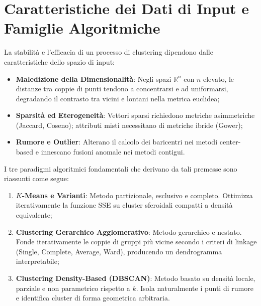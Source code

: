 \section{Caratteristiche dei Dati di Input e Famiglie Algoritmiche}
\label{sec:dm-data-characteristics-algorithms}

La stabilità e l'efficacia di un processo di clustering dipendono dalle caratteristiche dello spazio di input:
\begin{itemize}
    \item \textbf{Maledizione della Dimensionalità}: Negli spazi $\mathbb{R}^n$ con $n$ elevato, le distanze tra coppie di punti tendono a concentrarsi e ad uniformarsi, degradando il contrasto tra vicini e lontani nella metrica euclidea;
    \item \textbf{Sparsità ed Eterogeneità}: Vettori sparsi richiedono metriche asimmetriche (Jaccard, Coseno); attributi misti necessitano di metriche ibride (Gower);
    \item \textbf{Rumore e Outlier}: Alterano il calcolo dei baricentri nei metodi center-based e innescano fusioni anomale nei metodi contigui.
\end{itemize}

I tre paradigmi algoritmici fondamentali che derivano da tali premesse sono riassunti come segue:
\begin{enumerate}
    \item \textbf{$K$-Means e Varianti}: Metodo partizionale, esclusivo e completo. Ottimizza iterativamente la funzione SSE su cluster sferoidali compatti a densità equivalente;
    \item \textbf{Clustering Gerarchico Agglomerativo}: Metodo gerarchico e nestato. Fonde iterativamente le coppie di gruppi più vicine secondo i criteri di linkage (Single, Complete, Average, Ward), producendo un dendrogramma interpretabile;
    \item \textbf{Clustering Density-Based (DBSCAN)}: Metodo basato su densità locale, parziale e non parametrico rispetto a $k$. Isola naturalmente i punti di rumore e identifica cluster di forma geometrica arbitraria.
\end{enumerate}
